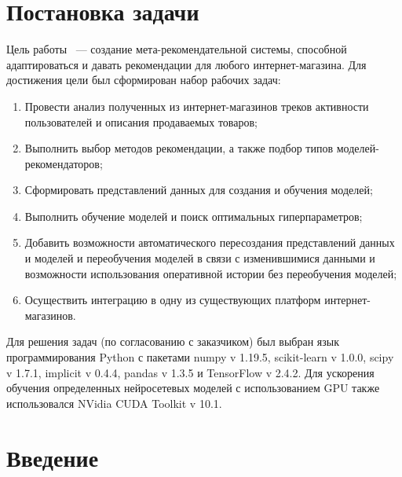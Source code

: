 \documentclass[14pt]{mmcs_article}
\begin{document}

\renewcommand{\contentsname}{Оглавление}

\tableofcontents

\newpage
{}

\section*{Постановка задачи}


Цель работы ~--- создание мета-рекомендательной системы, способной адаптироваться и давать рекомендации для любого интернет-магазина. Для достижения цели был сформирован набор рабочих задач:
\begin{enumerate}
	\item Провести анализ полученных из интернет-магазинов треков активности пользователей и описания продаваемых товаров;
	\item Выполнить выбор методов рекомендации, а также подбор типов моделей-рекомендаторов;
	\item Сформировать представлений данных для создания и обучения моделей;
	\item Выполнить обучение моделей и поиск оптимальных гиперпараметров;
	\item Добавить возможности автоматического пересоздания представлений данных и моделей и переобучения моделей в связи с изменившимися данными и возможности использования оперативной истории без переобучения моделей;
	\item Осуществить интеграцию в одну из существующих платформ интернет-магазинов.
\end{enumerate}

Для решения задач (по согласованию с заказчиком) был выбран язык программирования Python с пакетами numpy v 1.19.5, scikit-learn v 1.0.0, scipy v 1.7.1, implicit v 0.4.4, pandas v 1.3.5 и TensorFlow v 2.4.2. Для ускорения обучения определенных нейросетевых моделей с использованием GPU также использовался NVidia CUDA Toolkit v 10.1.
 
\newpage
{}
\section*{Введение}
\end{document}
